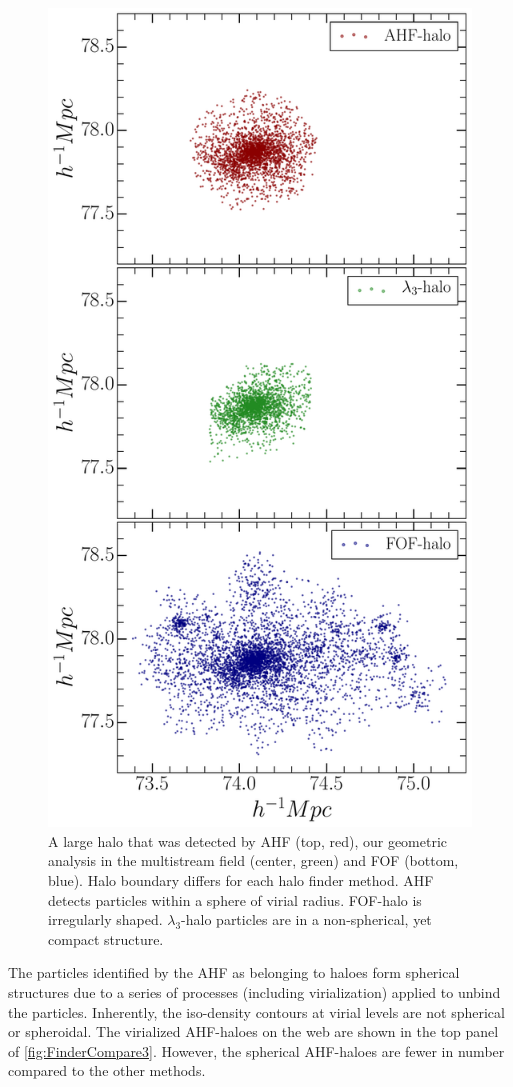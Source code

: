 \begin{figure}
\begin{minipage}[t]{.99\linewidth}
 \centering
 \includegraphics[width=10.cm]{Chapter5/Source_v2/fig11.pdf}
\end{minipage}\hfill
\caption{A large halo that was detected by AHF (top, red), our geometric analysis in the multistream field (center, green) and FOF (bottom, blue). Halo boundary differs for each halo finder method. AHF detects particles within a sphere of virial radius. FOF-halo is irregularly shaped. $\lambda_3$-halo particles are in a non-spherical, yet compact structure. }
\label{fig:FinderCompareAll}
\end{figure}



The particles identified by the AHF as belonging to haloes form spherical structures due to a series of processes (including virialization) applied to unbind the particles. Inherently, the iso-density contours at virial levels are not spherical or spheroidal. The virialized AHF-haloes on the web are shown in the top panel of \autoref{fig:FinderCompare3}. However, the spherical AHF-haloes are fewer in number compared to the other methods. 

